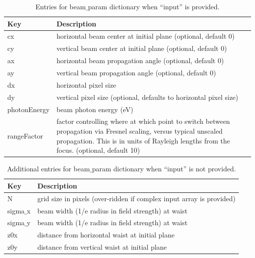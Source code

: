 \documentclass[11pt,fleqn]{article} %
\begin{document}
\begin{table}
  \begin{center}
    \caption{Entries for beam$\_$param dictionary when ``input'' is provided.}
    \label{beam_input}
    \begin{tabular} { | p{2.5cm} || p{10cm} |}
      \hline
      \textbf{Key} & \textbf{Description}\\
      \hline
      cx & horizontal beam center at initial plane (optional, default 0) \\
      \hline
      cy & vertical beam center at initial plane (optional, default 0) \\
      \hline
      ax & horizontal beam propagation angle (optional, default 0)\\
      \hline
      ay & vertical beam propagation angle (optional, default 0)\\
      \hline
      dx & horizontal pixel size\\
      \hline
      dy & vertical pixel size (optional, defaults to horizontal pixel size)\\
      \hline
      photonEnergy & beam photon energy (eV)\\
      \hline
      rangeFactor & factor controlling where at which point to switch between propagation via Fresnel scaling, versus typical unscaled propagation. This is in units of Rayleigh lengths from the focus. (optional, default 10)\\
      \hline
    \end{tabular}
  \end{center}
\end{table}

\begin{table}
  \begin{center}
    \caption{Additional entries for beam$\_$param dictionary when ``input'' is not provided.}
    \label{beam_no_input}
    \begin{tabular} { | p{2.5cm} || p{10cm} |}
      \hline
      \textbf{Key} & \textbf{Description}\\
      \hline
      N & grid size in pixels (over-ridden if complex input array is provided)\\
      \hline
      sigma$\_$x & beam width (1/e radius in field strength) at waist\\
      \hline
      sigma$\_$y & beam width (1/e radius in field strength) at waist\\
      \hline
      z0x & distance from horizontal waist at initial plane\\
      \hline
      z0y & distance from vertical waist at initial plane\\
      \hline
    \end{tabular}
  \end{center}
\end{table}
\end{document}
